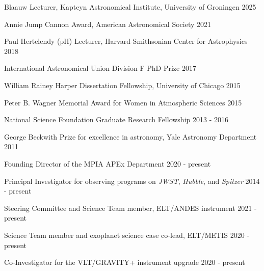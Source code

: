 \documentclass[12pt,letterpaper]{article}
\begin{document}

\begin{list}{}{\cvlist}
\item Blaauw Lecturer, Kapteyn Astronomical Institute, University of Groningen \hfill 2025
\item Annie Jump Cannon Award, American Astronomical Society \hfill 2021
\item Paul Hertelendy (pH) Lecturer, Harvard-Smithsonian Center for Astrophysics \hfill 2018 
\item International Astronomical Union Division F PhD Prize \hfill 2017
\item William Rainey Harper Dissertation Fellowship, University of Chicago \hfill 2015
\item Peter B. Wagner Memorial Award for Women in Atmospheric Sciences \hfill 2015
\item National Science Foundation Graduate Research Fellowship \hfill 2013 - 2016
\item George Beckwith Prize for excellence in astronomy, Yale Astronomy Department \hfill2011

\end{list}


\begin{list}{}{\cvlist}
\item Founding Director of the MPIA APEx Department \hfill 2020 - present
\item Principal Investigator for observing programs on \emph{JWST}, \emph{Hubble}, and \emph{Spitzer} \hfill 2014 - present
\item Steering Committee and Science Team member, ELT/ANDES instrument \hfill 2021 - present
\item Science Team member and exoplanet science case co-lead, ELT/METIS \hfill 2020 - present
\item Co-Investigator for the VLT/GRAVITY+ instrument upgrade \hfill 2020 - present
\end{list}


\end{document}
